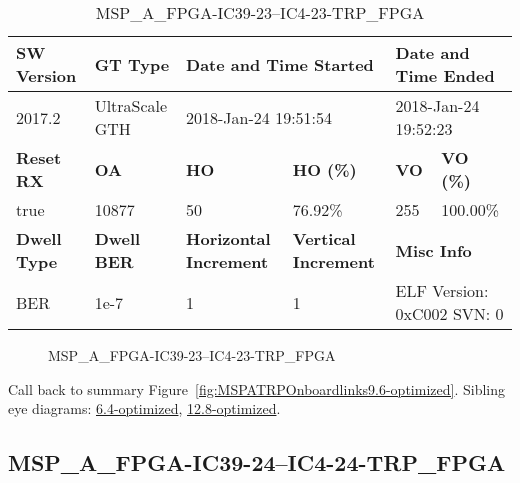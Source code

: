 \begin{table}[h]
\centering
\caption{MSP\_A\_FPGA-IC39-23--IC4-23-TRP\_FPGA}
\label{tab:MSPAFPGAIC3923IC423TRPFPGA9.6-optimized}
\begin{tabular}{@{}|l|l|l|l|l|l|@{}}
\toprule
\textbf{SW Version}                & \textbf{GT Type}   & \multicolumn{2}{l|}{\textbf{Date and Time Started}}            & \multicolumn{2}{l|}{\textbf{Date and Time Ended}}        \\ \midrule
2017.2                       & UltraScale GTH          & \multicolumn{2}{l|}{2018-Jan-24 19:51:54}                   & \multicolumn{2}{l|}{2018-Jan-24 19:52:23}               \\ \midrule
\textbf{Reset RX}                  & \textbf{OA} & \textbf{HO}   & \textbf{HO (\%)} & \textbf{VO} & \textbf{VO (\%)} \\ \midrule
true & 10877        & 50          & 76.92\%        & 255        & 100.00\%       \\ \midrule
\textbf{Dwell Type}                & \textbf{Dwell BER} & \textbf{Horizontal Increment} & \textbf{Vertical Increment}    & \multicolumn{2}{l|}{\textbf{Misc Info}}                  \\ \midrule
BER                            & 1e-7        & 1        & 1           & \multicolumn{2}{l|}{ELF Version: 0xC002 SVN: 0}                         \\ \bottomrule
\end{tabular}
\end{table}

\begin{figure}[h]
\caption{MSP\_A\_FPGA-IC39-23--IC4-23-TRP\_FPGA} \label{fig:MSPAFPGAIC3923IC423TRPFPGA9.6-optimized}
\end{figure}

Call back to summary Figure~\ref{fig:MSPATRPOnboardlinks9.6-optimized}.
Sibling eye diagrams: \hyperref[sec:MSPAFPGAIC3923IC423TRPFPGA6.4-optimized]{6.4-optimized}, \hyperref[sec:MSPAFPGAIC3923IC423TRPFPGA12.8-optimized]{12.8-optimized}.

\clearpage
\newpage


\subsection{MSP\_A\_FPGA-IC39-24--IC4-24-TRP\_FPGA}\label{sec:MSPAFPGAIC3924IC424TRPFPGA9.6-optimized}

